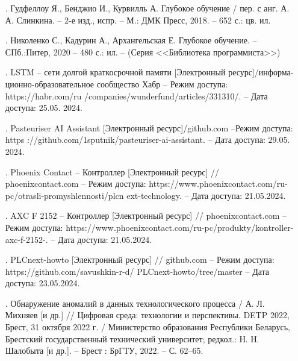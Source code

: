 {\begin{itemize}[leftmargin=2.15cm, labelwidth=0.65cm, labelsep=0.0cm]
    \item[\theimagecntr.] Гудфеллоу Я., Бенджио И., Курвилль А. Глубокое обучение / пер. с анг. А. А. Слинкина. {--} 2-е изд., испр. {--} М.: ДМК Пресс, 2018. {--} 652 с.: цв. ил. 
    \addtocounter{imagecntr}{1}

    \item[\theimagecntr.] Николенко С., Кадурин А., Архангельская Е. Глубокое обучение. {--} СПб.:Питер, 2020 {--} 480 с.: ил. {--} (Серия <<Библиотека программиста>>)
    \addtocounter{imagecntr}{1}

    \item[\theimagecntr.] LSTM {--} сети долгой краткосрочной памяти [Электронный ресурс]/информа- ционно-образовательное сообщество Хабр {--} Режим доступа: https://habr.com/ru /companies/wunderfund/articles/331310/. {--} Дата доступа: 25.05. 2024.
    \addtocounter{imagecntr}{1}

    \item[\theimagecntr.] Pasteuriser AI Assistant [Электронный ресурс]/github.com {--}Режим доступа: https ://github.com/1sputnik/pasteuriser-ai-assistant. {--} Дата доступа: 29.05. 2024.
    \addtocounter{imagecntr}{1}

    \item[\theimagecntr.] Phoenix Contact {--} Контроллер [Электронный ресурс] // phoenixcontact.com – Режим доступа: https://www.phoenixcontact.com/ru-pc/otrasli-promyshlennosti/plcn ext-technology. {--} Дата доступа: 21.05.2024.
    \addtocounter{imagecntr}{1}

    \item[\theimagecntr.] AXC F 2152 {--} Контроллер [Электронный ресурс] // phoenixcontact.com – Режим доступа: https://www.phoenixcontact.com/ru-pc/produkty/kontroller-axc-f-2152-. {--} Дата доступа: 21.05.2024.
    \addtocounter{imagecntr}{1}

    \item[\theimagecntr.] PLCnext-howto [Электронный ресурс] // github.com {--} Режим доступа: https://git\newline hub.com/savushkin-r-d/ PLCnext-howto/tree/master {--} Дата доступа: 23.05.2024.
    \addtocounter{imagecntr}{1}

    \item[\theimagecntr.] Обнаружение аномалий в данных технологического процесса / А. Л. Михняев [и др.] // Цифровая среда: технологии и перспективы. DETP 2022, Брест, 31 октября 2022 г. / Министерство образования Республики Беларусь, Брестский государственный технический университет; редкол.: Н. Н. Шалобыта [и др.]. {--} Брест : БрГТУ, 2022. {--} С. 62–65.
    \addtocounter{imagecntr}{1}


\end{itemize}}
